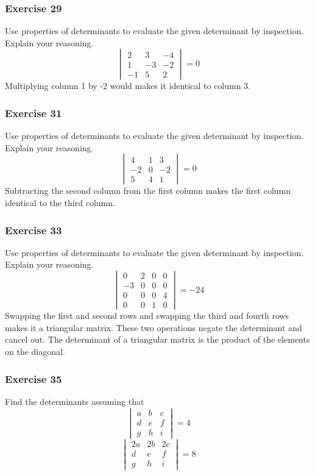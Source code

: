 \documentclass{math}
\begin{document}
\subsubsection*{Exercise 29}
Use properties of determinants to evaluate the given determinant by inspection.
Explain your reasoning.
\[ \begin{vmatrix}
  2 & 3 & -4 \\
  1 & -3 & -2 \\
  -1 & 5 & 2
\end{vmatrix} = 0 \]
Multiplying column 1 by -2 would makes it identical to column 3.

\subsubsection*{Exercise 31}
Use properties of determinants to evaluate the given determinant by inspection.
Explain your reasoning.
\[ \begin{vmatrix}
  4 & 1 & 3 \\
  -2 & 0 & -2 \\
  5 & 4 & 1
\end{vmatrix} = 0 \]
Subtracting the second column from the first column makes the first column
identical to the third column.

\subsubsection*{Exercise 33}
Use properties of determinants to evaluate the given determinant by inspection.
Explain your reasoning.
\[ \begin{vmatrix}
  0 & 2 & 0 & 0 \\
  -3 & 0 & 0 & 0 \\
  0 & 0 & 0 & 4 \\
  0 & 0 & 1 & 0
\end{vmatrix} = -24 \]
Swapping the first and second rows and swapping the third and fourth rows makes
it a triangular matrix. These two operations negate the determinant and cancel
out. The determinant of a triangular matrix is the product of the elements on
the diagonal.

\subsubsection*{Exercise 35}
Find the determinants assuming that
\[ \begin{vmatrix}
  a & b & c \\
  d & e & f \\
  g & h & i
\end{vmatrix} = 4 \]
\[ \begin{vmatrix}
  2a & 2b & 2c \\
  d & e & f \\
  g & h & i
\end{vmatrix} = 8 \]
\end{document}
